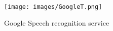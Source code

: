 \begin{figure}[!h]
\centering
\texttt{[image: images/GoogleT.png]}
\caption{Google Speech recognition service}
\label{fig:hlo1}
\end{figure}
